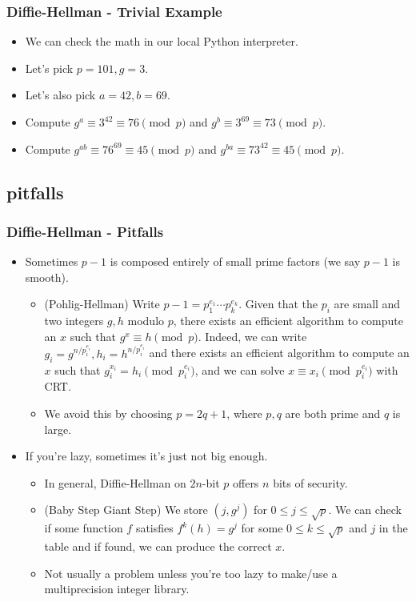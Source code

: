 \documentclass[aspectratio=169,t]{beamer}
\begin{document}
\begin{frame}
\frametitle{Diffie-Hellman - Trivial Example}
\begin{itemize}
\item
We can check the math in our local Python interpreter. \pause
\item
Let's pick $p = 101, g = 3$. \pause
\item
Let's also pick $a = 42, b = 69$. \pause
\item
Compute $g^a \equiv 3^{42} \equiv 76 \pmod{p}$ and $g^b \equiv 3^{69} \equiv 73
\pmod{p}$. \pause
\item
Compute $g^{ab} \equiv 76^{69} \equiv 45 \pmod{p}$ and $g^{ba} \equiv 73^{42}
\equiv 45 \pmod{p}$.
\end{itemize}
\end{frame}

\subsection{pitfalls}
\begin{frame}
\frametitle{Diffie-Hellman - Pitfalls}
\begin{itemize}
\item
Sometimes $p - 1$ is composed entirely of small prime factors (we say $p - 1$ is
smooth). \pause
\begin{itemize}
\item
(Pohlig-Hellman) Write $p - 1 = p_1^{e_1} \cdots p_k^{e_k}$. Given that the
$p_i$ are small and two integers $g, h$ modulo $p$, there exists an efficient
algorithm to compute an $x$ such that $g^x \equiv h \pmod{p}$. Indeed, we can
write $g_i = g^{n/p_i^{e_i}}, h_i = h^{n/p_i^{e_i}}$ and there exists an
efficient algorithm to compute an $x$ such that $g_i^{x_i} = h_i
\pmod{p_i^{e_i}}$, and we can solve $x \equiv x_i \pmod{p_i^{e_i}}$ with CRT.
\pause
\item
We avoid this by choosing $p = 2q + 1$, where $p, q$ are both prime and $q$ is
large.
\end{itemize}
\pause
\item
If you're lazy, sometimes it's just not big enough.
\begin{itemize}
\item
In general, Diffie-Hellman on $2n$-bit $p$ offers $n$ bits of security. \pause
\item
(Baby Step Giant Step) We store $(j, g^j)$ for $0 \leq j \leq \sqrt{p}$. We can
check if some function $f$ satisfies $f^k(h) = g^j$ for some $0 \leq k \leq
\sqrt{p}$ and $j$ in the table and if found, we can produce the correct $x$.
\pause
\item
Not usually a problem unless you're too lazy to make/use a multiprecision
integer library.
\end{itemize}
\end{itemize}
\end{frame}
\end{document}
